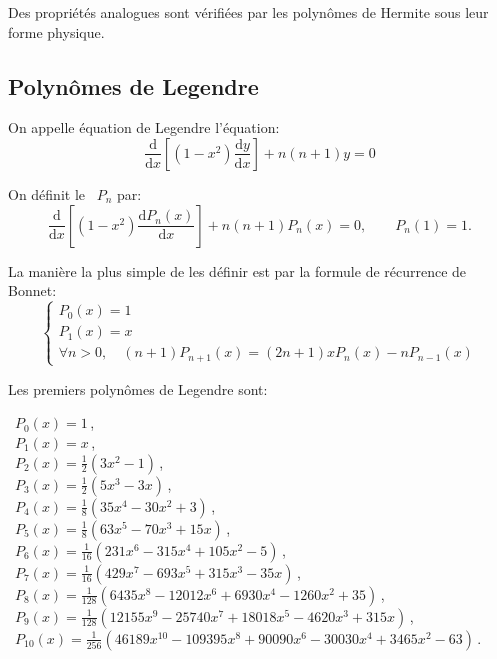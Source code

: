 Des propriétés analogues sont vérifiées par les polynômes de Hermite 
sous leur forme physique.





\medskip
\subsection{Polynômes de Legendre}

On appelle équation de Legendre l'équation:
\begin{equation}\frac{\textrm{d}}{\textrm{d}x}[(1-x^{2})\frac{\textrm{d}y}{\textrm{d}x}]+n(n+1)y=0\end{equation}

On définit le ~$P_n$ par:
\begin{equation}
\frac{\textrm{d}}{\textrm{d}x}[(1-x^{2})\frac{\textrm{d}P_n(x)}{\textrm{d}x}]+n(n+1)P_n(x)=0,\qquad P_n(1)=1.
\end{equation}

\medskip
La manière la plus simple de les définir est par la formule de récurrence de Bonnet:
\begin{equation}\left\{
\begin{array}{l}
P_0(x)=1\\
P_1(x)=x\\
\forall n>0, \quad

  (n+1)P_{n+1}(x)=(2n+1)xP_n(x) - nP_{n-1}(x)
\end{array} 
\right.
\end{equation}

\medskip
{}
Les premiers polynômes de Legendre sont:

\noindent
 ~$P_{0}(x)=1\,$,\\
 ~$P_{1}(x)=x\,$,\\
 ~$P_{2}(x)=\frac{1}{2}(3x^{2}-1)\,$,\\
 ~$P_{3}(x)=\frac{1}{2}(5x^{3}-3x)\,$,\\
 ~$P_{4}(x)=\frac{1}{8}(35x^{4}-30x^{2}+3)\,$,\\
 ~$P_{5}(x)=\frac{1}{8}(63x^{5}-70x^{3}+15x)\,$,\\
 ~$P_{6}(x)=\frac{1}{16}(231x^{6}-315x^{4}+105x^{2}-5)\,$,\\
 ~$P_{7}(x)=\frac{1}{16}(429x^{7}-693x^{5}+315x^{3}-35x)\,$,\\
 ~$P_{8}(x)=\frac{1}{128}(6435x^{8}-12012x^{6}+6930x^{4}-1260x^{2}+35)\,$,\\
 ~$P_{9}(x)=\frac{1}{128}(12155x^{9}-25740x^{7}+18018x^{5}-4620x^{3}+315x)\,$,\\
 ~$P_{10}(x)=\frac{1}{256}(46189x^{10}-109395x^{8}+90090x^{6}-30030x^{4}+3465x^{2}-63)\,$.

